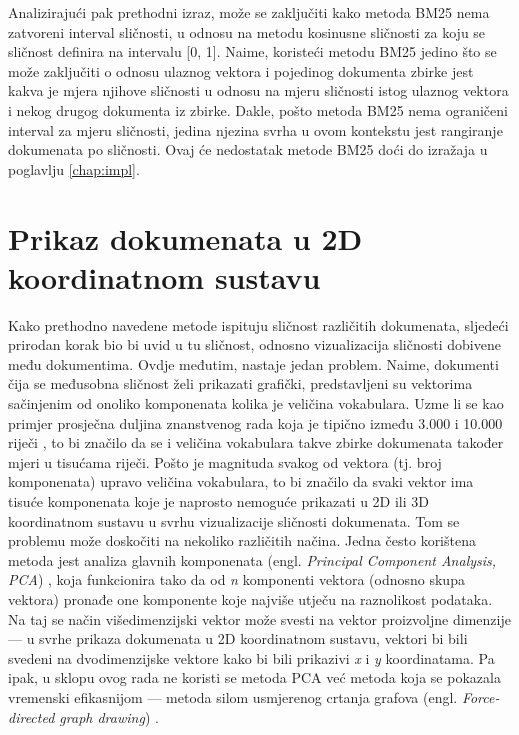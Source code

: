 \documentclass[times, utf8, zavrsni, numeric]{fer}
\begin{document}
Analizirajući pak prethodni izraz, može se zaključiti kako metoda BM25 nema zatvoreni interval sličnosti, u odnosu na metodu kosinusne sličnosti za koju se sličnost definira na intervalu [0, 1]. Naime, koristeći metodu BM25 jedino što se može zaključiti o odnosu ulaznog vektora i pojedinog dokumenta zbirke jest kakva je mjera njihove sličnosti u odnosu na mjeru sličnosti istog ulaznog vektora i nekog drugog dokumenta iz zbirke. Dakle, pošto metoda BM25 nema ograničeni interval za mjeru sličnosti, jedina njezina svrha u ovom kontekstu jest rangiranje dokumenata po sličnosti. Ovaj će nedostatak metode BM25 doći do izražaja u poglavlju \ref{chap:impl}.

\chapter{Prikaz dokumenata u 2D koordinatnom sustavu}
\label{chap:docsin2d}
Kako prethodno navedene metode ispituju sličnost različitih dokumenata, sljedeći prirodan korak bio bi uvid u tu sličnost, odnosno vizualizacija  sličnosti dobivene među dokumentima. Ovdje međutim, nastaje jedan problem. Naime, dokumenti čija se međusobna sličnost želi prikazati grafički, predstavljeni su vektorima sačinjenim od onoliko komponenata kolika je veličina vokabulara. Uzme li se kao primjer prosječna duljina znanstvenog rada koja je tipično između 3.000 i 10.000 riječi \cite{bjork2009scientific}, to bi značilo da se i veličina vokabulara takve zbirke dokumenata također mjeri u tisućama riječi. Pošto je magnituda svakog od vektora (tj. broj komponenata) upravo veličina vokabulara, to bi značilo da svaki vektor ima tisuće komponenata koje je naprosto nemoguće prikazati u 2D ili 3D koordinatnom sustavu u svrhu vizualizacije sličnosti dokumenata. Tom se problemu može doskočiti na nekoliko različitih načina. Jedna često korištena metoda jest analiza glavnih komponenata (engl. \textit{Principal Component Analysis, PCA}) \cite{wold1987principal}, koja funkcionira tako da od \textit{n} komponenti vektora (odnosno skupa vektora) pronađe one komponente koje najviše utječu na raznolikost podataka. Na taj se način višedimenzijski vektor može svesti na vektor proizvoljne dimenzije — u svrhe prikaza dokumenata u 2D koordinatnom sustavu, vektori bi bili svedeni na dvodimenzijske vektore kako bi bili prikazivi \textit{x} i \textit{y} koordinatama. Pa ipak, u sklopu ovog rada ne koristi se metoda PCA već metoda koja se pokazala vremenski efikasnijom — metoda silom usmjerenog crtanja grafova (engl. \textit{Force-directed graph drawing}) \cite{FruchtermanReingold}.
\end{document}
